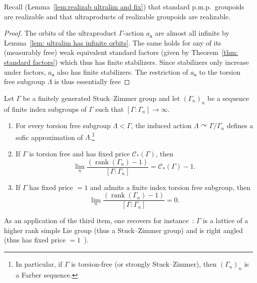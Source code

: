 \documentclass[AHL,Unicode,longabstracts,published]{cedram}
\newcommand{\acting}{\curvearrowright}
\newcommand{\vraicost}{\mathscr{C}}
\DeclareMathOperator{\rank}{rank}
\newcommand{\ul}{\mathfrak{u}}
\newcommand{\pmp}{p.m.p.\ }
\begin{document}
Recall (Lemma~\ref{lem:realizab ultralim and fix}) that standard \pmp groupoids are realizable and that ultraproducts of realizable groupoids are realizable.


\begin{proof}
The orbits of the ultraproduct $\Gamma$-action $a_{\ul}$ are almost all infinite by Lemma~\ref{lem: ultralim has infinite orbits}. The same holds for any of its (measurably free) weak equivalent standard factors (given by Theorem~\ref{thm: standard factors}) which thus has finite stabilizers. Since stabilizers only increase under factors, $a_{\ul}$ also has finite stabilizers. The restriction of $a_{\ul}$ to the torsion free subgroup $\Lambda$ is thus essentially free
\end{proof}


\begin{theo}\label{th: Stuck-Zimmer gps and seq f i subgroups}
Let $\Gamma$ be a finitely generated Stuck--Zimmer group and let $(\Gamma_n)_n$ be a sequence of finite index subgroups of $\Gamma$ such that $[\Gamma:\Gamma_n]\to \infty$.
\begin{enumerate}
\item\label{it: torsion free subg and sofic approx}
For every torsion free subgroup $\Lambda<\Gamma$, the induced action $\Lambda\acting \Gamma/\Gamma_n$ defines a sofic approximation of $\Lambda$.\footnote{In particular, if $\Gamma$ is torsion-free (or strongly Stuck--Zimmer), then $(\Gamma_n)_n$ is a Farber sequence.}
\item\label{it: rk grad vs fixed price}
If $\Gamma$ is torsion free and has fixed price $\vraicost_*(\Gamma)$, then
\begin{equation}
\lim_{n}
\frac{\left(\rank (\Gamma_n)-1\right)}{ [\Gamma:\Gamma_n]}=\vraicost_*(\Gamma)-1.
\end{equation}

\item\label{theo4.14.3} If $\Gamma$ has fixed price $=1$ and admits a finite index torsion free subgroup, then
\begin{equation}
\lim_{n} \frac{\left(
\rank (\Gamma_n)-1\right)}{ [\Gamma:\Gamma_n]}=0.
\end{equation}
\end{enumerate}
\end{theo}

As an application of the third item, one recovers for instance~\cite[Theorem~2]{Abert-Nikolov-Gelander}: $\Gamma$ is a lattice of a higher rank simple Lie group (thus a Stuck--Zimmer group) and is right angled (thus has fixed price $=1$~\cite{Gab-cost}).
\end{document}
